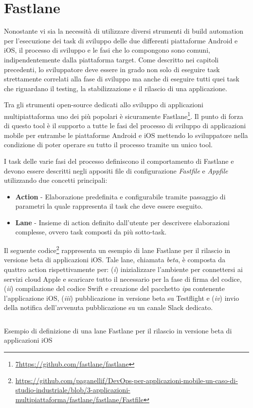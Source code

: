 \section{Fastlane}
\label{fastlane-sec}
Nonostante vi sia la necessità di utilizzare diversi strumenti di build automation per l'esecuzione dei task di sviluppo delle due differenti piattaforme Android e iOS, il processo di sviluppo e le fasi che lo compongono sono comuni, indipendentemente dalla piattaforma target. Come descritto nei capitoli precedenti, lo sviluppatore deve essere in grado non solo di eseguire task strettamente correlati alla fase di sviluppo ma anche di eseguire tutti quei task che riguardano il testing, la stabilizzazione e il rilascio di una applicazione.

Tra gli strumenti open-source dedicati allo sviluppo di applicazioni multipiattaforma uno dei più popolari è sicuramente Fastlane\footnote{\href{7https://github.com/fastlane/fastlane}{7https://github.com/fastlane/fastlane}}. Il punto di forza di questo tool è il supporto a tutte le fasi del processo di sviluppo di applicazioni mobile per entrambe le piattaforme Android e iOS mettendo lo sviluppatore nella condizione di poter operare su tutto il processo tramite un unico tool.

I task delle varie fasi del processo definiscono il comportamento di Fastlane e devono essere descritti negli appositi file di configurazione \textit{Fastfile} e \textit{Appfile} utilizzando due concetti principali:

\begin{itemize}
    \item \textbf{Action} - Elaborazione predefinita e configurabile tramite passaggio di parametri la quale rappresenta il task che deve essere eseguito.
    \item \textbf{Lane} - Insieme di action definito dall'utente per descrivere elaborazioni complesse, ovvero task composti da più sotto-task.
\end{itemize}

Il seguente codice\footnote{\href{https://github.com/paganellif/DevOps-per-applicazioni-mobile-un-caso-di-studio-industriale/blob/3-applicazioni-multipiattaforma/fastlane/fastlane/Fastfile}{https://github.com/paganellif/DevOps-per-applicazioni-mobile-un-caso-di-studio-industriale/blob/3-applicazioni-multipiattaforma/fastlane/fastlane/Fastfile}} rappresenta un esempio di lane Fastlane per il rilascio in versione beta di applicazioni iOS. Tale lane, chiamata \textit{beta}, è composta da quattro action rispettivamente per: (\textit{i}) inizializzare l'ambiente per connettersi ai servizi cloud Apple e scaricare tutto il necessario per la fase di firma del codice, (\textit{ii}) compilazione del codice Swift e creazione del pacchetto \textit{ipa} contenente l'applicazione iOS, (\textit{iii}) pubblicazione in versione beta su Testflight e (\textit{iv}) invio della notifica dell'avvenuta pubblicazione su un canale Slack dedicato.

\begin{listing}[H]
    \inputminted{ruby}{code/4-fastlane}
    \caption{Esempio di definizione di una lane Fastlane per il rilascio in versione beta di applicazioni iOS}
\end{listing}